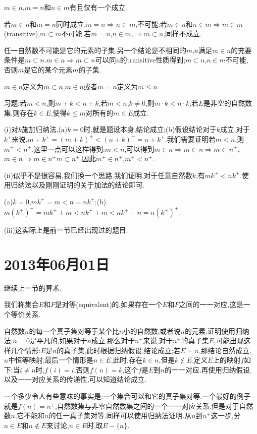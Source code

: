 \documentclass[12pt,a4paper,openany]{book}
\begin{document}
$m \in n$,$m=n$和$n \in m$有且仅有一个成立.

若$m \in n$和$m=n$同时成立,$m=n$$\Rightarrow$$n \subset m$,不可能;若$m \in n$和$n \in m$$\Rightarrow$$m \in m$(transitive),$m \subset m$不可能.若$m=n$,$n \in m$,$\Rightarrow$$m \subset n$,同样不成立.

任一自然数不可能是它的元素的子集,另一个结论是不相同的$m$,$n$满足$m \in n$的充要条件是$m \subset n$.$m \in n \Rightarrow m \subset n$可以同$n$的transitive性质得到;$m \subset n$,$n \in m$不可能,否则$m$是它的某个元素$m$的子集.

$m \in n$定义为$m \subset n$,$m \in n$或者$m=n$定义为$m \le n$.

习题:若$m<n$,则$m+k<n+k$,若$m<n$,$k \neq 0$,则$m \cdot k < n \cdot k$,若$E$是非空的自然数集,则存在$k \in E$,使得$k \le m$对所有的$m \in E$成立.

(i)对$k$施加归纳法,(a)$k=0$时,就是题设本身,结论成立;(b)假设结论对于$k$成立,对于$k^+$来说,$m+k^+=(m+k)^+<(n+k)^+=n+k^+$.我们需要证明若$m<n$,则$m^+<n^+$,这里一点可以这样得到:$m<n$,可以得到$m \in n$$\Rightarrow$$m \subset n$$\Rightarrow$$m \subset n^+$,$m \in n$$\Rightarrow$$m \in n^+$$m \subset n^+$,因此$m^+ \in n^+$,$m^+ < n^+$.

(ii)似乎不是很容易,我们换一个思路,我们证明,对于任意自然数$k$,有$mk^+<nk^+$.使用归纳法以及刚刚证明的关于加法的结论即可.

(a)$k=0$,$mk^+=m<n=nk^+$;(b)$m(k^+)^+=mk^++m<nk^++m<nk^++n=n(k^+)^+$.

(iii)这实际上是前一节已经出现过的题目.

\section{2013年06月01日}
继续上一节的算术.

我们称集合$E$和$F$是对等(equivalent)的,如果存在一个$E$和$F$之间的一一对应,这是一个等价关系.

自然数$n$的每一个真子集对等于某个比$n$小的自然数,或者说$n$的元素.证明使用归纳法.$n=0$是平凡的,如果对于$n$成立,那么对于$n^+$来说,对于$n^+$的真子集$E$,可能出现这样几个情形:$E$是$n$的真子集,此时根据归纳假设,结论成立;若$E=n$,那结论自然成立,$n$中恒等映射;最后一个情形是$n \in E$,此时,存在$k \in n$,但是$k \notin E$,定义$E$上的映射$f$如下:当$i \neq n$时,$f(i)=i$,否则$f(n)=k$,这个$f$是$E$到$n$的一一对应.再使用归纳假设,以及一一对应关系的传递性,可以知道结论成立.

一个多少令人有些意味的事实是:一个集合可以和它的真子集对等.一个最好的例子就是$f(n)=n^+$,自然数集与非零自然数集之间的一个一一对应关系.但是对于自然数$n$,它不能和$n$的任一真子集对等.同样可以使用归纳法证明.从$n$到$n^+$这一步,分$n \in E$和$n \notin E$来讨论,$n \in E$时,取$E-\{n\}$.
\end{document}

